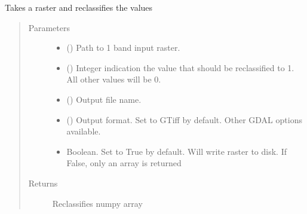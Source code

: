 \documentclass[letterpaper,10pt,english]{sphinxmanual}
\begin{document}

\begin{fulllineitems}
\label{\detokenize{index:pyeo.classification.raster_reclass_binary}}
Takes a raster and reclassifies the values
\begin{quote}\begin{description}
\item[{Parameters}] \leavevmode\begin{itemize}
\item {} 
 () \textendash{} Path to 1 band input  raster.

\item {} 
 () \textendash{} Integer indication the value that should be reclassified to 1. All other values will be 0.

\item {} 
 () \textendash{} Output file name.

\item {} 
 () \textendash{} Output format. Set to GTiff by default. Other GDAL options available.

\item {} 
 \textendash{} Boolean. Set to True by default. Will write raster to disk. If False, only an array is returned

\end{itemize}

\item[{Returns}] \leavevmode
Reclassifies numpy array

\end{description}\end{quote}

\end{fulllineitems}
\end{document}
